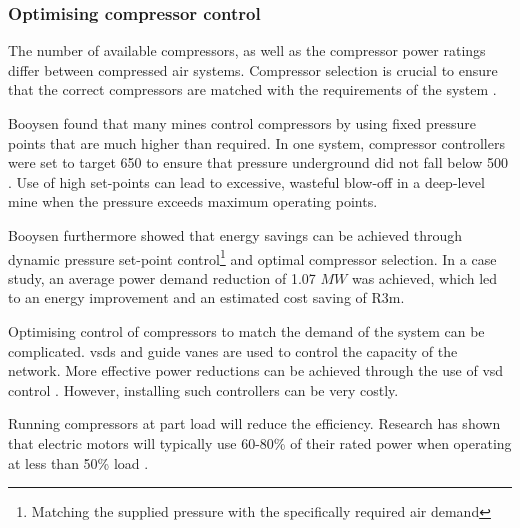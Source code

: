 		\subsubsection{Optimising compressor control}
		The number of available compressors, as well as the compressor power ratings differ between compressed air systems. Compressor selection is crucial to ensure that the correct compressors are matched with the requirements of the system \cite{marais2010expert}.
		\par 
		Booysen \cite{Booysen2012Masters} found that many mines control compressors by using fixed pressure points that are much higher than required. In one system, compressor controllers were set to target 650  to ensure that pressure underground did not fall below 500 . Use of high  set-points can lead to excessive, wasteful blow-off in a deep-level mine when the pressure exceeds maximum operating points.
		\par
		 Booysen \cite{booysen2009optimising} furthermore showed that energy savings can be achieved through dynamic pressure  set-point control\footnote{Matching the supplied pressure with the specifically required air demand} and optimal compressor selection. In a case study, an average power demand reduction of 1.07 $MW$ was achieved, which led to an energy improvement and an estimated cost saving of R3m.
		\par 
	 	Optimising control of compressors to match the demand of the system can be complicated. \glspl{vsd} and guide vanes are used to control the capacity of the network. More effective power reductions can be achieved through the use of \gls{vsd} control \cite{Bredenkamp2013Masters}. However, installing such  controllers can be very costly.
	 	\par 
	 	 Running compressors at part load will reduce the efficiency. Research has shown that electric motors will typically use 60-80\% of their rated power when operating at less than 50\% load \cite{Saidur2010}.
